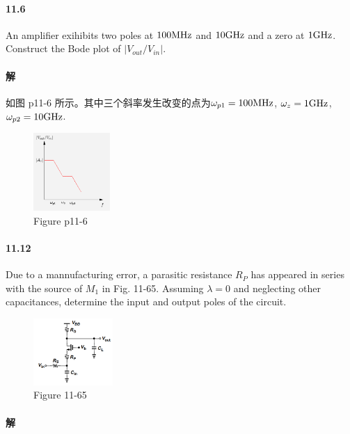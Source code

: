 \documentclass[hyperref, UTF8]{ctexart}
\newcommand{\megahertz}{{\rm MHz}}
\newcommand{\gigahertz}{{\rm GHz}}
\begin{document}
\paragraph{11.6} \label{11.6}
    An amplifier exihibits two poles at $100\megahertz$ and $10\gigahertz$ and a zero at $1\gigahertz$. Construct the Bode plot of $|V_{out}/V_{in}|$.

\paragraph{解}
    如图 p11-6 所示。其中三个斜率发生改变的点为$\omega_{p1} = 100 \megahertz$, $\omega_{z} = 1\gigahertz$, $\omega_{p2} = 10\gigahertz$.

    \begin{figure}[!htb]
        \centering
        \includegraphics[width=0.259\textwidth]{p11-6-sol.png}
        \caption*{Figure p11-6}
    \end{figure}

\paragraph{11.12} \label{11.12}
    Due to a mannufacturing error, a parasitic resistance $R_P$ has appeared in series with the source of $M_1$ in Fig. 11-65. Assuming $\lambda = 0$ and neglecting other capacitances, determine the input and output poles of the circuit.

    \begin{figure}[!htb]
        \centering
        \includegraphics[width=0.268\textwidth]{p11-65.png}
        \caption*{Figure 11-65}
    \end{figure}

\paragraph{解}
\end{document}
